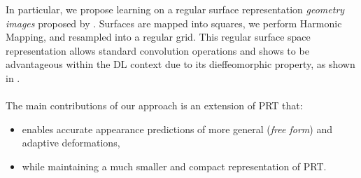 In particular, we propose learning on a regular surface representation \textit{geometry images} proposed by \citep{gu2002geometry}. Surfaces are mapped into squares, we perform Harmonic Mapping, and resampled into a regular grid. This regular surface space representation allows standard convolution operations and shows to be advantageous within the DL context due to its dieffeomorphic property, as shown in \cite{sinha2016deep}. 
\\
\\
The main contributions of our approach is an extension of PRT that:
\begin{itemize}
\item enables accurate appearance predictions of more general (\textit{free form}) and adaptive deformations,
\item while maintaining a much smaller and compact representation of PRT. 
\end{itemize}
